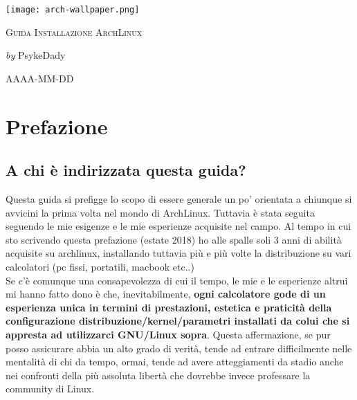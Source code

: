 \documentclass[twoside,italian]{book}
\newcommand{\arch}{ArchLinux}
\begin{document}
	
	
	\begin{titlepage}
		\begin{center}
		 
		\texttt{[image: arch-wallpaper.png]}\\
		
		\vspace{3cm}
		
		{\huge \textsc{Guida Installazione \arch}}
		
		\vspace{1.5cm}
        {\LARGE \textit{by} PsykeDady}
		
		\vspace{1cm}
		{\Large AAAA-MM-DD}
		
		\end{center}
	\end{titlepage}

	\cleardoublepage
	
	
	\chapter*{Prefazione}

	\section*{A chi è indirizzata questa guida?}
	Questa guida si prefigge lo scopo di essere generale un po' orientata a chiunque si avvicini la prima volta nel mondo di \arch. Tuttavia è stata seguita seguendo le mie esigenze e le mie esperienze acquisite nel campo. Al tempo in cui sto scrivendo questa prefazione (estate 2018) ho alle spalle soli 3 anni di abilità acquisite su archlinux, installando tuttavia più e più volte la distribuzione su vari calcolatori (pc fissi, portatili, macbook etc..)\\

	Se c'è comunque una consapevolezza di cui il tempo, le mie e le esperienze altrui mi hanno fatto dono è che, inevitabilmente, \textbf{ogni calcolatore gode di un esperienza unica in termini di prestazioni, estetica e praticità della configurazione distribuzione/kernel/parametri installati da colui che si appresta ad utilizzarci GNU/Linux sopra}. Questa affermazione, se pur posso assicurare abbia un alto grado di verità, tende ad entrare difficilmente nelle mentalità di chi da tempo, ormai, tende ad avere atteggiamenti da stadio anche nei confronti della più assoluta libertà che dovrebbe invece professare la community di Linux.\\
\end{document}
